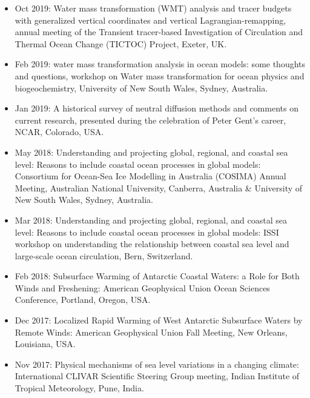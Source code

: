 \documentclass{article}
\begin{document}
\begin{itemize}[leftmargin=*]

\item Oct 2019: {\sc Water mass transformation (WMT) analysis
  and tracer budgets with generalized vertical coordinates and vertical Lagrangian-remapping}, annual meeting of the Transient tracer-based Investigation of Circulation and Thermal Ocean Change (TICTOC) Project, Exeter, UK.

\item Feb 2019: {\sc water mass transformation analysis in ocean models: some thoughts and questions}, workshop on Water mass transformation for ocean physics and biogeochemistry, University of New South Wales, Sydney, Australia.  

\item Jan 2019: {\sc A historical survey of neutral diffusion methods and comments on current research}, presented during the celebration of Peter Gent's career, NCAR, Colorado, USA.  

\item May 2018: {\sc Understanding and projecting global, regional, and coastal sea level: Reasons to include coastal ocean processes in global models}: Consortium for Ocean-Sea Ice Modelling in Australia (COSIMA) Annual Meeting, Australian National University, Canberra, Australia \& University of New South Wales, Sydney, Australia. 

\item Mar 2018: {\sc Understanding and projecting global, regional, and coastal sea level: Reasons to include coastal ocean processes in global models}: ISSI workshop on understanding the relationship between coastal sea level and large-scale ocean circulation, Bern, Switzerland. 

\item Feb 2018: {\sc Subsurface Warming of Antarctic Coastal Waters: a Role for Both Winds and Freshening}: {\sc American Geophysical Union Ocean Sciences Conference}, Portland, Oregon, USA.

\item Dec 2017: {\sc Localized Rapid Warming of West Antarctic Subsurface Waters by Remote Winds}: American Geophysical Union Fall Meeting, New Orleans, Louisiana, USA. 

\item Nov 2017: {\sc Physical mechanisms of sea level variations in a changing climate}: International CLIVAR Scientific Steering Group meeting, Indian Institute of Tropical Meteorology, Pune, India.



\end{itemize}
\end{document}
